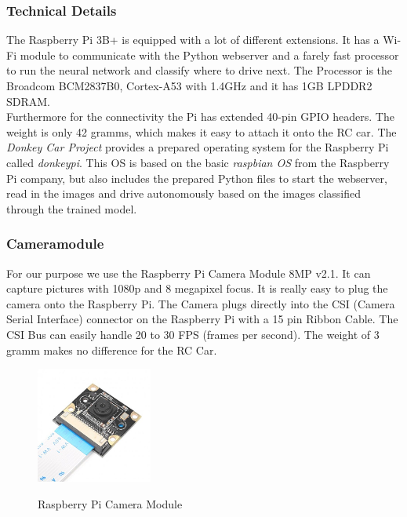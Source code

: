 \documentclass[journal]{IEEEtran}
\begin{document}
\subsubsection{Technical Details}
The Raspberry Pi 3B+ is equipped with a lot of different extensions. It has a Wi-Fi module to communicate with the Python webserver and a farely fast processor to run the neural network and classify where to drive next. The Processor is the Broadcom BCM2837B0, Cortex-A53 with 1.4GHz and it has 1GB LPDDR2 SDRAM. \\
Furthermore for the connectivity the Pi has extended 40-pin GPIO headers. The weight is only 42 gramms, which makes it easy to attach it onto the RC car. The \textit{Donkey Car Project} \cite{donkey} provides a prepared operating system for the Raspberry Pi called \textit{donkeypi}. This OS is based on the basic \textit{raspbian OS} from the Raspberry Pi company, but also includes the prepared Python files to start the webserver, read in the images and drive autonomously based on the images classified through the trained model. \\

\subsubsection{Cameramodule}
\label{sec:cameramodule}

For our purpose we use the Raspberry Pi Camera Module 8MP v2.1. It can capture pictures with 1080p and 8 megapixel focus. 
It is really easy to plug the camera onto the Raspberry Pi. The Camera plugs directly into the CSI (Camera Serial Interface) connector on the Raspberry Pi with a 15 pin Ribbon Cable. The CSI Bus can easily handle 20 to 30 FPS (frames per second). The weight of 3 gramm makes no difference for the RC Car. \\

\begin{figure}
  \begin{center}
  \includegraphics[width=1.5in]{photo/camera.jpg}\\
  \caption{Raspberry Pi Camera Module}\label{camera}
  \end{center}
\end{figure}
\end{document}
